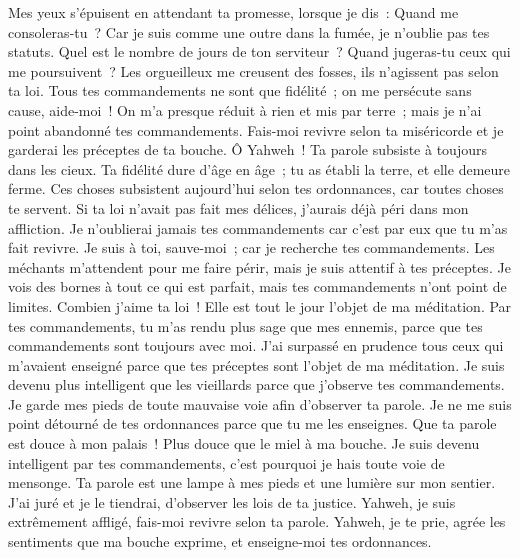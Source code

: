 \begin{multicols}{2}
Mes yeux s'épuisent en attendant ta promesse, lorsque je dis~: Quand me consoleras-tu~?
Car je suis comme une outre dans la fumée, je n'oublie pas tes statuts.
Quel est le nombre de jours de ton serviteur~? Quand jugeras-tu ceux qui me poursuivent~?
Les orgueilleux me creusent des fosses, ils n'agissent pas selon ta loi.
Tous tes commandements ne sont que fidélité~; on me persécute sans cause, aide-moi~!
On m'a presque réduit à rien et mis par terre~; mais je n'ai point abandonné tes commandements.
Fais-moi revivre selon ta miséricorde et je garderai les préceptes de ta bouche.
 Ô Yahweh~! Ta parole subsiste à toujours dans les cieux.
Ta fidélité dure d'âge en âge~; tu as établi la terre, et elle demeure ferme.
Ces choses subsistent aujourd'hui selon tes ordonnances, car toutes choses te servent.
Si ta loi n'avait pas fait mes délices, j'aurais déjà péri dans mon affliction.
Je n'oublierai jamais tes commandements car c'est par eux que tu m'as fait revivre.
Je suis à toi, sauve-moi~; car je recherche tes commandements.
Les méchants m'attendent pour me faire périr, mais je suis attentif à tes préceptes.
Je vois des bornes à tout ce qui est parfait, mais tes commandements n'ont point de limites.
 Combien j'aime ta loi~! Elle est tout le jour l'objet de ma méditation.
Par tes commandements, tu m'as rendu plus sage que mes ennemis, parce que tes commandements sont toujours avec moi.
J'ai surpassé en prudence tous ceux qui m'avaient enseigné parce que tes préceptes sont l'objet de ma méditation.
Je suis devenu plus intelligent que les vieillards parce que j'observe tes commandements.
Je garde mes pieds de toute mauvaise voie afin d'observer ta parole.
Je ne me suis point détourné de tes ordonnances parce que tu me les enseignes.
Que ta parole est douce à mon palais~! Plus douce que le miel à ma bouche.
Je suis devenu intelligent par tes commandements, c'est pourquoi je hais toute voie de mensonge.
 Ta parole est une lampe à mes pieds et une lumière sur mon sentier.
J'ai juré et je le tiendrai, d'observer les lois de ta justice.
Yahweh, je suis extrêmement affligé, fais-moi revivre selon ta parole.
Yahweh, je te prie, agrée les sentiments que ma bouche exprime, et enseigne-moi tes ordonnances.

\end{multicols}
